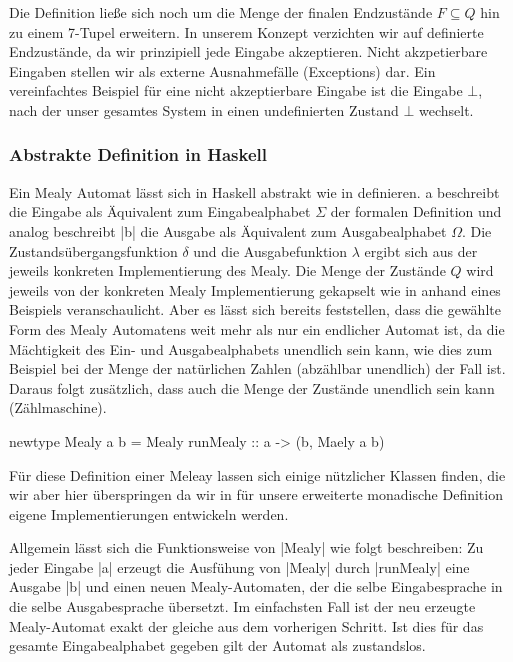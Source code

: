 Die Definition ließe sich noch um die Menge der finalen Endzustände $F \subseteq Q$ hin zu einem 7-Tupel erweitern. In unserem Konzept verzichten wir auf definierte Endzustände, da wir prinzipiell jede Eingabe akzeptieren. Nicht akzpetierbare Eingaben stellen wir als externe Ausnahmefälle (Exceptions) dar. Ein vereinfachtes Beispiel für eine nicht akzeptierbare Eingabe ist die Eingabe $\bot$, nach der unser gesamtes System in einen undefinierten Zustand $\bot$ wechselt.

\subsubsection{Abstrakte Definition in Haskell}
\label{sec:abstrakte-definition-haskell}

Ein Mealy Automat lässt sich in Haskell abstrakt wie in  definieren. {\ttfamily a} beschreibt die Eingabe als Äquivalent zum Eingabealphabet $\Sigma$ der formalen Definition und analog beschreibt |b| die Ausgabe als Äquivalent zum Ausgabealphabet $\Omega$. Die Zustandsübergangsfunktion $\delta$ und die Ausgabefunktion $\lambda$ ergibt sich aus der jeweils konkreten Implementierung des Mealy. Die Menge der Zustände $Q$ wird jeweils von der konkreten Mealy Implementierung gekapselt wie in  anhand eines Beispiels veranschaulicht. Aber es lässt sich bereits feststellen, dass die gewählte Form des Mealy Automatens weit mehr als nur ein endlicher Automat ist, da die Mächtigkeit des Ein- und Ausgabealphabets unendlich sein kann, wie dies zum Beispiel bei der Menge der natürlichen Zahlen (abzählbar unendlich) der Fall ist. Daraus folgt zusätzlich, dass auch die Menge der Zustände unendlich sein kann (Zählmaschine).

\begin{haskell}[label={lst:haskell-mealy},caption={Definition Mealy in Haskell\protect\footnotemark},float]
newtype Mealy a b = Mealy { runMealy :: a -> (b, Maely a b) }
\end{haskell}

Für diese Definition einer Meleay lassen sich einige nützlicher Klassen finden, die wir aber hier überspringen da wir in  für unsere erweiterte monadische Definition eigene Implementierungen entwickeln werden.

Allgemein lässt sich die Funktionsweise von |Mealy| wie folgt beschreiben: Zu jeder Eingabe |a| erzeugt die Ausfühung von |Mealy| durch |runMealy| eine Ausgabe |b| und einen neuen Mealy-Automaten, der die selbe Eingabesprache in die selbe Ausgabesprache übersetzt. Im einfachsten Fall ist der neu erzeugte Mealy-Automat exakt der gleiche aus dem vorherigen Schritt. Ist dies für das gesamte Eingabealphabet gegeben gilt der Automat als zustandslos.


